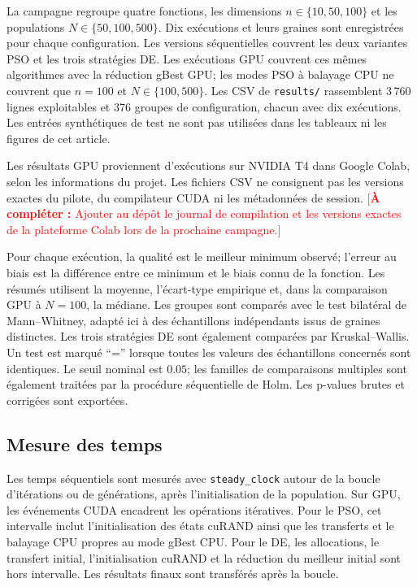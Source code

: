 \documentclass[conference]{IEEEtran}
\newcommand{\todo}[1]{\textcolor{red}{[\textbf{À compléter :} #1]}}
\newcommand{\PSO}{\textsc{PSO}}
\newcommand{\DE}{\textsc{DE}}
\begin{document}
La campagne regroupe quatre fonctions, les dimensions $n\in\{10,50,100\}$ et
les populations $N\in\{50,100,500\}$. Dix exécutions et leurs graines sont
enregistrées pour chaque configuration. Les versions séquentielles couvrent
les deux variantes \PSO{} et les trois stratégies \DE. Les exécutions GPU
couvrent ces mêmes algorithmes avec la réduction gBest GPU; les modes \PSO{}
à balayage CPU ne couvrent que $n=100$ et $N\in\{100,500\}$. Les CSV de
\texttt{results/} rassemblent 3\,760 lignes exploitables et 376 groupes de
configuration, chacun avec dix exécutions. Les entrées synthétiques de test
ne sont pas utilisées dans les tableaux ni les figures de cet article.

Les résultats GPU proviennent d'exécutions sur NVIDIA T4 dans Google Colab,
selon les informations du projet. Les fichiers CSV ne consignent pas les
versions exactes du pilote, du compilateur CUDA ni les métadonnées de session.
\todo{Ajouter au dépôt le journal de compilation et les versions exactes de la
plateforme Colab lors de la prochaine campagne.}

Pour chaque exécution, la qualité est le meilleur minimum observé; l'erreur
au biais est la différence entre ce minimum et le biais connu de la fonction.
Les résumés utilisent la moyenne, l'écart-type empirique et, dans la
comparaison GPU à $N=100$, la médiane. Les groupes sont comparés avec le test
bilatéral de Mann--Whitney, adapté ici à des échantillons indépendants issus
de graines distinctes. Les trois stratégies DE sont également comparées par
Kruskal--Wallis. Un test est marqué ``='' lorsque toutes les valeurs des
échantillons concernés sont identiques. Le seuil nominal est $0.05$; les
familles de comparaisons multiples sont également traitées par la procédure
séquentielle de Holm. Les p-values brutes et corrigées sont exportées.

\subsection{Mesure des temps}
\label{sec:timing}

Les temps séquentiels sont mesurés avec \texttt{steady\_clock} autour de la
boucle d'itérations ou de générations, après l'initialisation de la population.
Sur GPU, les événements CUDA encadrent les opérations itératives. Pour le
\PSO{}, cet intervalle inclut l'initialisation des états cuRAND ainsi que les
transferts et le balayage CPU propres au mode gBest CPU. Pour le \DE{}, les
allocations, le transfert initial, l'initialisation cuRAND et la réduction du
meilleur initial sont hors intervalle. Les résultats finaux sont transférés
après la boucle.
\end{document}
